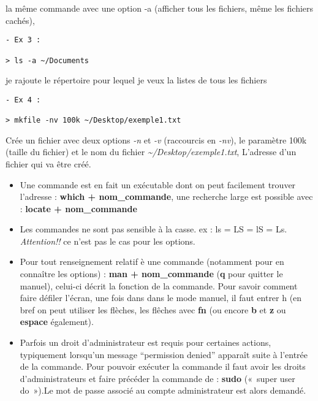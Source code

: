 \begin{Shaded}
\begin{Highlighting}[]
   
\end{Highlighting}
\end{Shaded}

la même commande avec une option -a (afficher tous les fichiers, même
les fichiers cachés),

\begin{verbatim}
- Ex 3 :

> ls -a ~/Documents
\end{verbatim}

je rajoute le répertoire pour lequel je veux la listes de tous les
fichiers

\begin{verbatim}
- Ex 4 :

> mkfile -nv 100k ~/Desktop/exemple1.txt
\end{verbatim}

Crée un fichier avec deux options \emph{-n} et \emph{-v} (raccourcis en
\emph{-nv}), le paramètre 100k (taille du fichier) et le nom du fichier
\emph{\textasciitilde{}/Desktop/exemple1.txt}, L'adresse d'un fichier
qui va être créé.

\begin{itemize}
\item
  Une commande est en fait un exécutable dont on peut facilement trouver
  l'adresse : \textbf{which + nom\_commande}, une recherche large est
  possible avec : \textbf{locate + nom\_commande}
\item
  Les commandes ne sont pas sensible à la casse. ex : ls = LS = lS = Ls.
  \emph{Attention!!} ce n'est pas le cas pour les options.
\item
  Pour tout renseignement relatif è une commande (notamment pour en
  connaître les options) : \textbf{man + nom\_commande} (\textbf{q} pour
  quitter le manuel), celui-ci décrit la fonction de la commande. Pour
  savoir comment faire défiler l'écran, une fois dans dans le mode
  manuel, il faut entrer h (en bref on peut utiliser les flèches, les
  flêches avec \textbf{fn} (ou encore \textbf{b }et \textbf{z} ou
  \textbf{espace} également).
\item
  Parfois un droit d'administrateur est requis pour certaines actions,
  typiquement lorsqu'un message ``permission denied'' apparaît suite à
  l'entrée de la commande. Pour pouvoir exécuter la commande il faut
  avoir les droits d'administrateurs et faire précéder la commande de :
  \textbf{sudo} («~super user do~»).Le mot de passe associé au compte
  administrateur est alors demandé.
\end{itemize}

